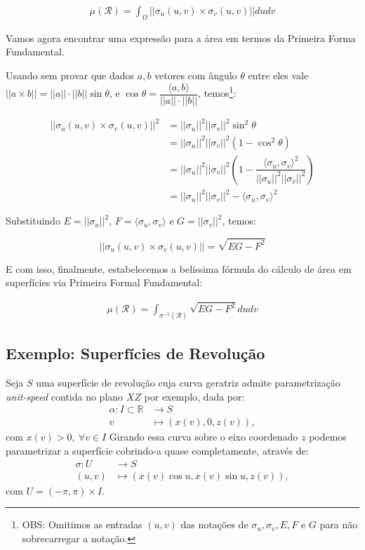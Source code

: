 \documentclass[12pt,letterpaper]{article}
\newcommand\rcur{\mathcal{R}}
\newcommand{\real}{\mathbb{R}}
\begin{document}
 \begin{align*}
 	\mu(\rcur)=\displaystyle\int_{\Omega}||\sigma_u(u,v)\times\sigma_v(u,v)||dudv
 \end{align*}

Vamos agora encontrar uma expressão para a área em termos da Primeira Forma Fundamental.

Usando sem provar que dados $a,b$ vetores com ângulo $\theta$ entre eles vale $||a\times b||=||a||\cdot||b||\sin\theta$, e $\cos\theta=\dfrac{\langle a,b\rangle}{||a||\cdot||b||}$, temos\footnote{OBS: Omitimos as entradas $(u,v)$ das notações de $\sigma_u,\sigma_v,E,F$ e $G$ para não sobrecarregar a notação.}:

\begin{align*}
	||\sigma_u(u,v)\times\sigma_v(u,v)||^2&=||\sigma_u||^2||\sigma_v||^2\sin^2\theta\\&=||\sigma_u||^2||\sigma_v||^2(1-\cos^2\theta)\\
	&=||\sigma_u||^2||\sigma_v||^2\left(1-\dfrac{\langle\sigma_u,\sigma_v\rangle^2}{||\sigma_u||^2||\sigma_v||^2}\right)\\
	&=||\sigma_u||^2||\sigma_v||^2-\langle\sigma_u,\sigma_v\rangle^2
\end{align*}

Substituindo $E=||\sigma_u||^2$, $F=\langle\sigma_u,\sigma_v\rangle$ e $G=||\sigma_v||^2$, temos:

$$||\sigma_u(u,v)\times\sigma_v(u,v)||=\sqrt{EG-F^2}$$

E com isso, finalmente, estabelecemos a belíssima fórmula do cálculo de área em superfícies via Primeira Formal Fundamental:

\begin{align}
	\displaystyle\mu(\rcur)=\int_{\sigma^{-1}(\rcur)}\sqrt{EG-F^2}dudv \label{theformula}
\end{align}

\subsection{Exemplo: Superfícies de Revolução}

 Seja $S$ uma superfície de revolução cuja curva geratriz admite parametrização \textit{unit-speed} contida no plano $XZ$ por exemplo, dada por:
\begin{align*}
	\alpha:I\subset\real&\to S\\
	v &\mapsto (x(v),0,z(v)),
\end{align*}
com $x(v)>0,~\forall v \in I$
 Girando essa curva sobre o eixo coordenado $z$ podemos parametrizar a superfície cobrindo-a quase completamente, através de:
  \begin{align*}
  	\sigma:U&\to S\\
  	(u,v)&\mapsto (x(v)\cos u,x(v)\sin u,z(v)),
  \end{align*}
com $U=(-\pi,\pi)\times I$.
\end{document}
